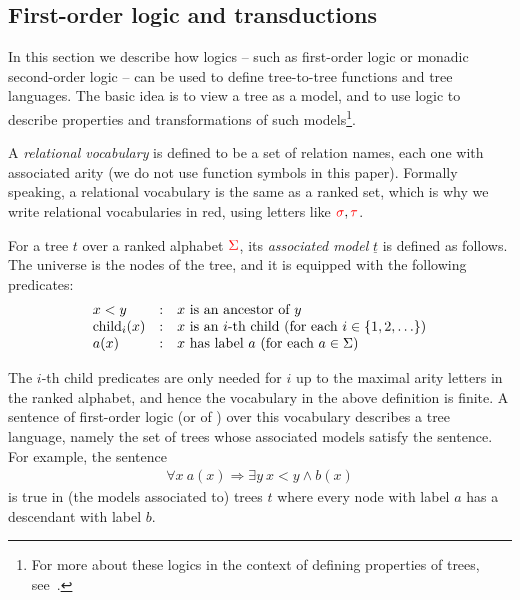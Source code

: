   
\subsection{First-order logic and transductions}
In this section we  describe how logics -- such as first-order logic or monadic second-order logic -- can be used to define tree-to-tree functions and tree languages. The basic idea is to view a tree as a model, and to use logic to describe properties and transformations of such models\footnote{For more about these logics in the context of defining properties of trees, see~\cite[Section 3]{thomas1997languages}.}. 

A \emph{relational vocabulary} is defined to be a set of relation names, each one with associated arity (we do not use function symbols in this paper). Formally speaking, a relational vocabulary is the same as a ranked set, which is why we write relational vocabularies in red, using letters like ${\color{red}{\sigma}}, {\color{red}{\tau}}$. 

\begin{definition}\label{def:tree-model}
   For a tree $t$  over a ranked alphabet ${\color{red}{\Sigma}}$, its \emph{associated model} $\underline t$ is defined as follows. The  universe is the nodes of the tree, and it is equipped with the following predicates:
   $$\begin{array}{lcl}
   x<y & : &   \text{$x$ is an ancestor of $y$} \\
   \mathrm{child}_i(x) & : & \text{$x$ is an $i$-th child (for each $i\in \{1,2,\ldots\}$)} \\
   a(x) & : &   \text{$x$ has label $a$ (for each $a \in \Sigma$)}
   \end{array}$$
    \end{definition}

The $i$-th child predicates are only needed for $i$ up to the maximal arity letters in the ranked alphabet, and hence the vocabulary in the above definition is finite. 
 A sentence of first-order logic (or of \mso)  over this vocabulary   describes a tree language, namely the set of trees whose associated models satisfy the sentence.  For example, the sentence 
 \begin{align*}
 \forall x \ a(x) \Rightarrow \exists y \ x < y \land b(x)
 \end{align*} 
 is true in (the models associated to)  trees $t$ where every node with label $a$ has a descendant with label $b$.  
 
